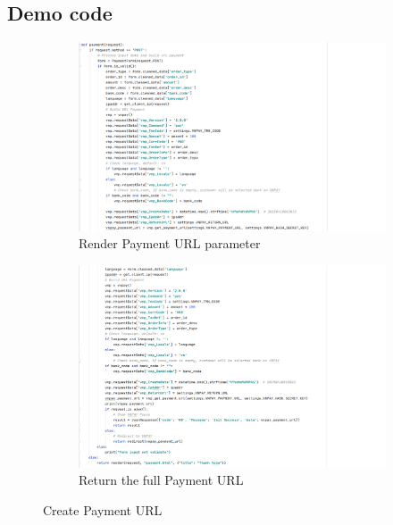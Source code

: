 \documentclass[12pt,a4paper]{article}
\begin{document}
\subsection{Demo code}
\begin{figure}[h]
	\centering
  	\begin{subfigure}[b]{\linewidth}
  		\includegraphics[width=\linewidth]{payment-1.png}
    	\caption{Render Payment URL parameter}
  	\end{subfigure}
  	\begin{subfigure}[b]{\linewidth}
    	\includegraphics[width=\linewidth]{payment-2.png}
    	\caption{Return the full Payment URL}
  	\end{subfigure}
  	\caption{Create Payment URL}
  	\label{fig:purl}
\end{figure}
\end{document}
